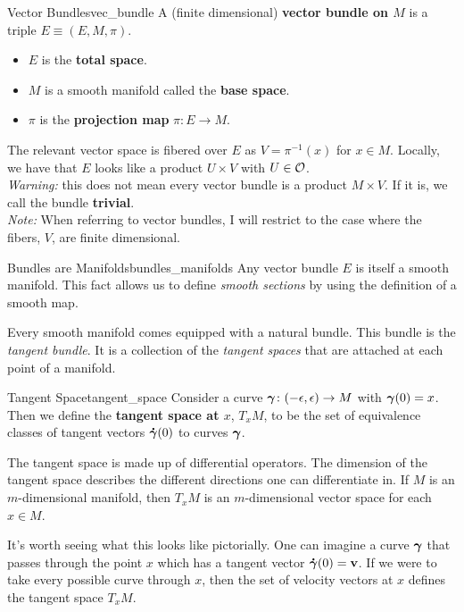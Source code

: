 \begin{df}{Vector Bundles}{vec_bundle}
A (finite dimensional) \textbf{vector bundle on $M$} is a triple $E\equiv (E,M,\pi)$.
\begin{itemize}
    \item $E$ is the \textbf{total space}.
    \item $M$ is a smooth manifold called the \textbf{base space}.
    \item $\pi$ is the \textbf{projection map} $\pi \colon E \to M$. 
\end{itemize}
The relevant vector space is fibered over $E$ as $V=\pi^{-1}(x)$ for $x\in M$. Locally, we have that $E$ looks like a product $U\times V$ with $U\in \mathcal{O}$. \\

\emph{Warning:} this does not mean every vector bundle is a product $M\times V$.  If it is, we call the bundle \textbf{trivial}.  \\

\emph{Note:} When referring to vector bundles, I will restrict to the case where the fibers, $V$, are finite dimensional.
\end{df}

\begin{rmk}{Bundles are Manifolds}{bundles_manifolds}
Any vector bundle $E$ is itself a smooth manifold.  This fact allows us to define \emph{smooth sections} by using the definition of a smooth map.
\end{rmk}

Every smooth manifold comes equipped with a natural bundle.  This bundle is the \emph{tangent bundle}. It is a collection of the \emph{tangent spaces} that are attached at each point of a manifold.

\begin{df}{Tangent Space}{tangent_space}
Consider a curve $\boldsymbol{\gamma} \colon (-\epsilon,\epsilon)\to M$ with $\boldsymbol{\gamma}(0)=x$.  Then we define the \textbf{tangent space at $x$}, $T_xM$, to be the set of equivalence classes of tangent vectors $\boldsymbol{\dot{\gamma}}(0)$ to curves $\boldsymbol{\gamma}$. 
\end{df}
The tangent space is made up of differential operators.  The dimension of the tangent space describes the different directions one can differentiate in.  If $M$ is an $m$-dimensional manifold, then $T_xM$ is an $m$-dimensional vector space for each $x\in M$.

It's worth seeing what this looks like pictorially.  One can imagine a curve $\boldsymbol{\gamma}$ that passes through the point $x$ which has a tangent vector $\boldsymbol{\dot{\gamma}}(0)=\mathbf{v}$.  If we were to take every possible curve through $x$, then the set of velocity vectors at $x$ defines the tangent space $T_xM$.

